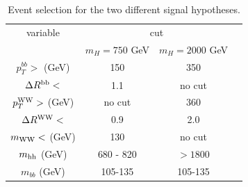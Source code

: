 \begin{table}
\caption{Event selection for the two different signal hypotheses.}
\label{tab:sig_reg_summary}
\begin{center}
\begin{tabular}{c|c|c|c}
\hline
 variable  & \multicolumn{2}{c}{cut} \\
 & $m_H = 750$ GeV &  $m_H = 2000$  GeV\\
\hline
 $p_T^{bb} >$ (GeV) & 150 & 350 \\
$\Delta R^{\rm bb}  <$ & 1.1 & no cut \\
$p_T^{\rm WW} >$ (GeV) & no cut & 360 \\
$\Delta R^{\rm WW} <$ & 0.9 & 2.0 \\
$m_{\rm WW} <$ (GeV) & 130 &  no cut \\
$m_{\rm hh}$ (GeV) & 680 - 820 & $> 1800$ \\
$m_{bb}$ (GeV) & 105-135 & 105-135 \\
\hline
\end{tabular}
\end{center}
\end{table}




